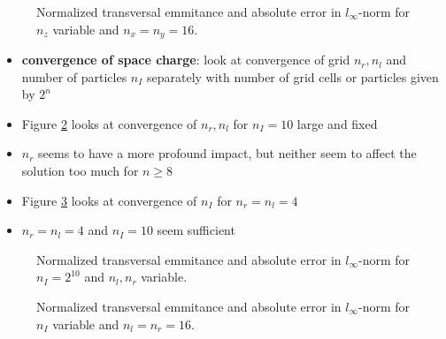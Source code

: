 \begin{center}
\begin{figure}[H]
   \begin{subfigure}{0.4\textwidth}
      
   \end{subfigure}
   \qquad \qquad \qquad
   \begin{subfigure}{0.4\textwidth}
      
   \end{subfigure}
   \caption{Normalized transversal emmitance and absolute error in $l_\infty$-norm for $n_z$ variable and $n_x=n_y=16$.}
   \label{fig:map_cvg_z}
\end{figure}
\end{center}

\begin{itemize}
   \item \textbf{convergence of space charge}: look at convergence of grid $n_r, n_l$ and number of particles $n_I$ separately with number of grid cells or particles given by $2^n$

   \item Figure \ref{fig:sc_cvg_rl} looks at convergence of $n_r, n_l$ for $n_I=10$ large and fixed
   \item $n_r$ seems to have a more profound impact, but neither seem to affect the solution too much for $n\geq8$

   \item Figure \ref{fig:sc_cvg_I} looks at convergence of $n_I$ for $n_r=n_l=4$
   \item $n_r=n_l=4$ and $n_I=10$ seem sufficient
\end{itemize}

\begin{center}
\begin{figure}[H]
   \begin{subfigure}{0.4\textwidth}
      
   \end{subfigure}
   \qquad \qquad \qquad
   \begin{subfigure}{0.4\textwidth}
      
   \end{subfigure}
   \caption{Normalized transversal emmitance and absolute error in $l_\infty$-norm for $n_I=2^{10}$ and $n_l, n_r$ variable.}
   \label{fig:sc_cvg_rl}
\end{figure}
\end{center}

\begin{center}
\begin{figure}[H]
   \begin{subfigure}{0.4\textwidth}
      
   \end{subfigure}
   \qquad \qquad \qquad
   \begin{subfigure}{0.4\textwidth}
      
   \end{subfigure}
   \caption{Normalized transversal emmitance and absolute error in $l_\infty$-norm for $n_I$ variable and $n_l=n_r=16$.}
   \label{fig:sc_cvg_I}
\end{figure}
\end{center}


